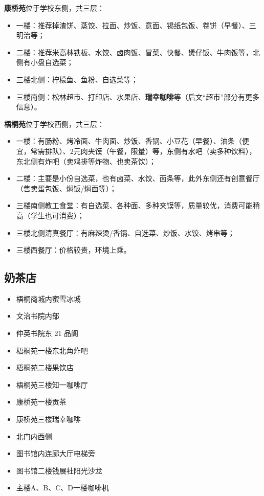 \documentclass[
decoration,  %
]{qyxf-book}
\begin{document}
	\textbf{康桥苑}位于学校东侧，共三层：
	\begin{itemize}
		\item 一楼：推荐掉渣饼、蒸饺、拉面、炒饭、意面、锡纸包饭、卷饼（早餐）、三明治等；
		\item 二楼：推荐米高林铁板、水饺、卤肉饭、冒菜、快餐、煲仔饭、牛肉饭等，北侧有小盘自选菜；
		\item 三楼北侧：柠檬鱼、鱼粉、自选菜等；
		\item 三楼南侧：松林超市、打印店、水果店、\textbf{瑞幸咖啡}等（后文“超市”部分有更多信息）。
	\end{itemize}
	
	\textbf{梧桐苑}位于学校西侧，共三层：
	\begin{itemize}
		\item 一楼：有肠粉、烤冷面、牛肉面、炒饭、香锅、小豆花（早餐）、油条（便宜，常需排队）、2元肉夹馍（午餐，限量）等，东侧有水吧（卖多种饮料），东北侧有炸吧（卖鸡排等炸物、也卖茶饮）；
		\item 二楼：主要是小份自选菜，也有卤菜、水饺、面条等，此外东侧还有创意餐厅（售卖蛋包饭、焖饭/焖面等）；
		\item 三楼南侧教工食堂：有自选菜、各种面、多种夹馍等，质量较优，消费可能稍高（学生也可消费）；
		\item 三楼北侧清真餐厅：有麻辣烫/香锅、自选菜、炒饭、水饺、烤串等；
		\item 三楼西餐厅：价格较贵，环境上乘。
	\end{itemize}
	
	\subsection{奶茶店}
	\begin{itemize}
		\item 梧桐商城内蜜雪冰城
		\item 文治书院内部
		\item 仲英书院东 21 品阁
		\item 梧桐苑一楼东北角炸吧
		\item 梧桐苑二楼果饮店
		\item 梧桐苑三楼知一咖啡厅
		\item 康桥苑一楼贡茶
		\item 康桥苑三楼瑞幸咖啡
		\item 北门内西侧
		\item 图书馆内连廊大厅电梯旁
		\item 图书馆二楼钱展社阳光沙龙
		\item 主楼A、B、C、D一楼咖啡机
	\end{itemize}
	
\end{document}
